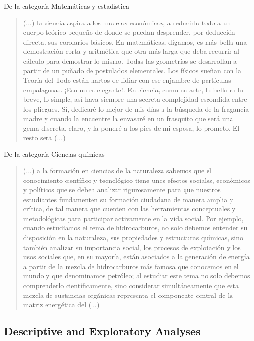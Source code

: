 \documentclass[11pt,a4paper]{article}
\begin{document}
	De la categoría Matemáticas y estadística
	
	\begin{quote}
		(...) la ciencia aspira a los modelos económicos, a reducirlo todo a un cuerpo teórico pequeño de donde se puedan desprender, por deducción directa, sus corolarios básicos. En matemáticas, digamos, es más bella una demostración corta y aritmética que otra más larga que deba recurrir al cálculo para demostrar lo mismo. Todas las geometrías se desarrollan a partir de un puñado de postulados elementales. Los físicos sueñan con la Teoría del Todo están hartos de lidiar con ese enjambre de partículas empalagosas. ¡Eso no es elegante!. En ciencia, como en arte, lo bello es lo breve, lo simple, así haya siempre una secreta complejidad escondida entre los pliegues. Sí, dedicaré lo mejor de mis días a la búsqueda de la fragancia madre y cuando la encuentre la envasaré en un frasquito que será una gema discreta, claro, y la pondré a los pies de mi esposa, lo prometo. El resto será (...)
	\end{quote}
	
	De la categoría Ciencias químicas
	
	\begin{quote}
		(...) a la formación en ciencias de la naturaleza sabemos que el conocimiento científico y tecnológico tiene unos efectos sociales, económicos y políticos que se deben analizar rigurosamente para que nuestros estudiantes fundamenten su formación ciudadana de manera amplia y crítica, de tal manera que cuenten con las herramientas conceptuales y metodológicas para participar activamente en la vida social. Por ejemplo, cuando estudiamos el tema de hidrocarburos, no solo debemos entender su disposición en la naturaleza, sus propiedades y estructuras químicas, sino también analizar su importancia social, los procesos de explotación y los usos sociales que, en su mayoría, están asociados a la generación de energía a partir de la mezcla de hidrocarburos más famosa que conocemos en el mundo y que denominamos petróleo; al estudiar este tema no solo debemos comprenderlo científicamente, sino considerar simultáneamente que esta mezcla de sustancias orgánicas representa el componente central de la matriz energética del (...)
	\end{quote}
	
	
	
\subsection{Descriptive and Exploratory Analyses}
\end{document}
